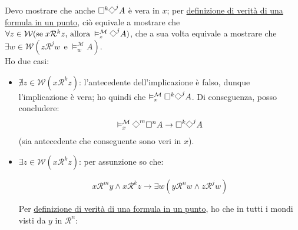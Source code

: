 \documentclass[a4paper,12pt]{article}
\newcommand{\Dmd}{\mathord{\vcenter{\hbox{\tikz[baseline=-0.6ex]{\draw[line width=0.4pt, scale=1, rotate=45] (0,0) rectangle (0.2,0.2);}}}}} %
\begin{document}
\begin{dimo}
\begin{enumerate}
		Devo mostrare che anche $\Box^k \Dmd^j A$ è vera in $x$; per \hyperlink{defverp}{definizione di verità di una formula in un punto}, ciò equivale a mostrare che $\forall z \in \mathcal{W} (\text{se} \; x\mathcal{R}^kz  \text{, allora} \: \vDash_z^{\mathcal{M}} \Dmd^j A)$, che a sua volta equivale a mostrare che $\exists w \in \mathcal{W} (z\mathcal{R}^jw \;\, \text{e} \; \vDash_w^{\mathcal{M}} A)$.\\
		Ho due casi:
		\begin{itemize}
			\item $\nexists z \in \mathcal{W} (x\mathcal{R}^kz)$: l'antecedente dell'implicazione è falso, dunque l'implicazione è vera; ho quindi che $\vDash_x^{\mathcal{M}} \Box^k \Dmd^j A$. Di conseguenza, posso concludere:
			$$\vDash_x^{\mathcal{M}} \Dmd^m \Box^n A \to \Box^k \Dmd^j A$$
			(sia antecedente che conseguente sono veri in $x$).
			\item $\exists z \in \mathcal{W} (x\mathcal{R}^kz)$: per assunzione so che:
			
			\begin{minipage}{0.48\textwidth}
				$$x\mathcal{R}^my \land x\mathcal{R}^kz \to \exists w (y\mathcal{R}^nw \land z\mathcal{R}^jw)$$
			\end{minipage}
			\begin{minipage}{0.48\textwidth}
				\begin{center}
				\end{center}
			\end{minipage}
			\vspace{0pt}
		
		Per \hyperlink{defverp}{definizione di verità di una formula in un punto}, ho che in tutti i mondi visti da $y$ in $\mathcal{R}^n$:
		

\end{itemize}
\end{enumerate}
\end{dimo}
\end{document}
